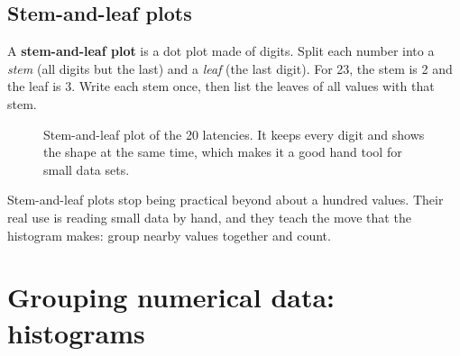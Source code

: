\subsection{Stem-and-leaf plots}

A \textbf{stem-and-leaf plot} is a dot plot made of digits. Split each number into a
\emph{stem} (all digits but the last) and a \emph{leaf} (the last digit). For 23, the stem is 2
and the leaf is 3. Write each stem once, then list the leaves of all values with that stem.

\begin{figure}[H]
\centering
{}
\caption{Stem-and-leaf plot of the 20 latencies. It keeps every digit and shows the shape at
the same time, which makes it a good hand tool for small data sets.}
\label{fig:data-stemleaf}
\end{figure}

Stem-and-leaf plots stop being practical beyond about a hundred values. Their real use is
reading small data by hand, and they teach the move that the histogram makes: group nearby
values together and count.

\section{Grouping numerical data: histograms}
\label{sec:data-histograms}

